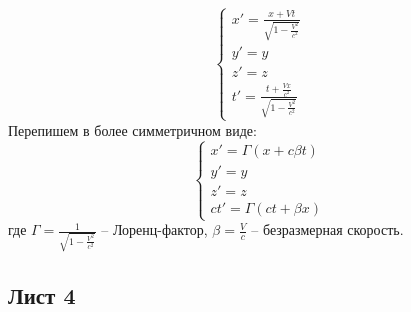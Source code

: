\documentclass[12pt]{article}
\begin{document}
\begin{enumerate}
        \begin{equation}
        \begin{cases}
        x' = \frac{x+Vt}{\sqrt{1-\frac{V^2}{c^2}}}\\
        y' = y\\
        z' = z\\
        t' = \frac{t+\frac{Vx}{c^2}}{\sqrt{1-\frac{V^2}{c^2}}}
        \end{cases}
        \end{equation}
        Перепишем в более симметричном виде:
        \begin{equation}
        \begin{cases}
        x' = \Gamma(x+c\beta t)\\
        y' = y\\
        z' = z\\
        ct' = \Gamma(ct+\beta x)
        \end{cases}
        \end{equation}
        где $\Gamma=\frac{1}{\sqrt{1-\frac{V^2}{c^2}}}$ -- Лоренц-фактор, $\beta=\frac{V}{c}$ -- безразмерная скорость.
    \end{enumerate}
\subsection{Лист 4}
\end{document}
